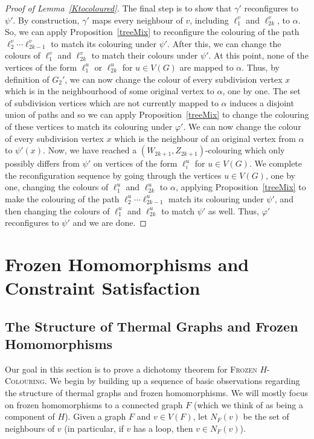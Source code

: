 \documentclass[11 pt]{amsart}
\theoremstyle{definition}
\theoremstyle{case}
\numberwithin{equation}{section}
\newcommand\Hfrz[1]{\textsc{Frozen $#1$-Colouring}}
\begin{document}
\begin{proof}[Proof of Lemma~\ref{Ktocoloured}]
The final step is to show that $\gamma'$ reconfigures to $\psi'$. By construction, $\gamma'$ maps every neighbour of $v$, including $\ell_1^v$ and $\ell_{2k}^v$, to $\alpha$. So, we can apply Proposition~\ref{treeMix} to reconfigure the colouring of the path $\ell_{2}^v\cdots\ell_{2k-1}^v$ to match its colouring under $\psi'$. After this, we can change the colours of $\ell_1^v$ and $\ell_{2k}^v$ to match their colours under $\psi'$. At this point, none of the vertices of the form $\ell_1^u$ or $\ell_{2k}^u$ for $u\in V(G)$ are mapped to $\alpha$. Thus, by definition of $G_2'$, we can now change the colour of every subdivision vertex $x$ which is in the neighbourhood of some original vertex to $\alpha$, one by one. The set of subdivision vertices which are not currently mapped to $\alpha$ induces a disjoint union of paths and so we can apply Proposition~\ref{treeMix} to change the colouring of these vertices to match its colouring under $\varphi'$. We can now change the colour of every subdivision vertex $x$ which is the neighbour of an original vertex from $\alpha$ to $\psi'(x)$. Now, we have reached a $(W_{2k+1},Z_{2k+1})$-colouring which only possibly differs from $\psi'$ on vertices of the form $\ell_i^u$ for $u\in V(G)$. We complete the reconfiguration sequence by going through the vertices $u\in V(G)$, one by one, changing the colours of $\ell_1^u$ and $\ell_{2k}^u$ to $\alpha$, applying Proposition~\ref{treeMix} to make the colouring of the path $\ell_2^u\cdots \ell_{2k-1}^u$ match its colouring under $\psi'$, and then changing the colours of $\ell_1^u$ and $\ell_{2k}^u$  to match $\psi'$ as well. Thus, $\varphi'$ reconfigures to $\psi'$ and we are done. 
\end{proof}

\section{Frozen Homomorphisms and Constraint Satisfaction}
\label{frozenSection}

\subsection{The Structure of Thermal Graphs and Frozen Homomorphisms}

Our goal in this section is to prove a dichotomy theorem for \Hfrz{H}. We begin by building up a sequence of basic observations regarding the structure of thermal graphs and frozen homomorphisms. We will mostly focus on frozen homomorphisms to a connected graph $F$ (which we think of as being a component of $H$). Given a graph $F$ and $v\in V(F)$, let $N_F(v)$ be the set of neighbours of $v$ (in particular, if $v$ has a loop, then $v\in N_F(v)$). 
\end{document}
